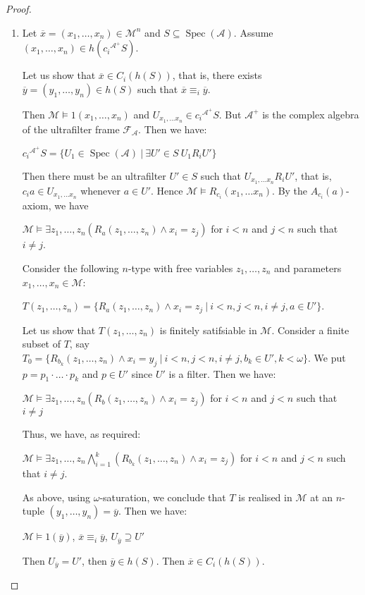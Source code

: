 \documentclass[a4paper]{article}
\theoremstyle{defin}
\theoremstyle{theorem}
\theoremstyle{claim}
\theoremstyle{prop}
\theoremstyle{lemma}
\theoremstyle{fact}
\theoremstyle{ex}
\theoremstyle{col}
\begin{document}
\begin{proof}
$ $

\begin{enumerate}
\item Let $\overline{x} = (x_1, \dots, x_n) \in \mathcal{M}^{n}$ and $S \subseteq \operatorname{Spec}(\mathcal{A})$. Assume $(x_1, \dots, x_n) \in h(c_i{^{\mathcal{A}^{+}}} S)$.

Let us show that $\overline{x} \in C_i (h(S))$, that is, there exists $\overline{y} = (y_1, \dots, y_n) \in h(S)$ such that $\overline{x} \equiv_{i} \overline{y}$.

Then $\mathcal{M} \models 1(x_1, \dots, x_n)$ and $U_{x_1, \dots x_n} \in c_i{^{\mathcal{A}^{+}}} S$. But $\mathcal{A}^{+}$ is the complex algebra of the ultrafilter frame $\mathcal{F}_{\mathcal{A}}$.
Then we have:
\begin{center}
$c_i{^{\mathcal{A}^{+}}} S = \{ U_1 \in \operatorname{Spec}(\mathcal{A}) \: | \: \exists U' \in S  \: U_1 R_{i} U' \}$
\end{center}
Then there must be an ultrafilter $U' \in S$ such that $U_{x_1, \dots x_n} R_{i} U'$, that is, $c_i a \in U_{x_1, \dots x_n}$ whenever $a \in U'$.
Hence $\mathcal{M} \models R_{c_i}(x_1, \dots x_n)$. By the $A_{c_i}(a)$-axiom, we have
\begin{center}
$\mathcal{M} \models \exists z_1, \dots, z_n (R_a(z_1, \dots, z_n) \land x_i = z_j)$ for $i < n$ and $j < n$ such that $i \neq j$.
\end{center}
Consider the following $n$-type with free variables $z_1, \dots, z_n$ and parameters $x_1, \dots, x_n \in \mathcal{M}$:
\begin{center}
$T(z_1, \dots, z_n) = \{ R_a(z_1, \dots, z_n) \land x_i = z_j \: | \: i < n, j < n, i \neq j, a \in U' \}$.
\end{center}
Let us show that $T(z_1, \dots, z_n)$ is finitely satifsiable in $\mathcal{M}$.
Consider a finite subset of $T$, say $T_0 = \{ R_{b_k}(z_1, \dots, z_n) \land x_i = y_j \: | \: i < n, j < n, i \neq j, b_k \in U', k < \omega \}$.
We put $p = p_1 \cdot \dots \cdot p_k$ and $p \in U'$ since $U'$ is a filter. Then we have:
\begin{center}
$\mathcal{M} \models \exists z_1, \dots, z_n (R_b(z_1, \dots, z_n) \land x_i = z_j)$ for $i < n$ and $j < n$ such that $i \neq j$
\end{center}
Thus, we have, as required:
\begin{center}
$\mathcal{M} \models \exists z_1, \dots, z_n \bigwedge \limits_{i = 1}^{k} (R_{b_k}(z_1, \dots, z_n) \land x_i = z_j)$ for $i < n$ and $j < n$ such that $i \neq j$.
\end{center}
As above, using $\omega$-saturation, we conclude that $T$ is realised in $\mathcal{M}$ at an $n$-tuple $(y_1, \dots, y_n) = \overline{y}$.
Then we have:
\begin{center}
$\mathcal{M} \models 1(\overline{y})$, $\overline{x} \equiv_i \overline{y}$, $U_{\overline{y}} \supseteq U'$
\end{center}
Then $U_{\overline{y}} = U'$, then $\overline{y} \in h(S)$. Then $\overline{x} \in C_i (h (S))$.


\end{enumerate}
\end{proof}
\end{document}
